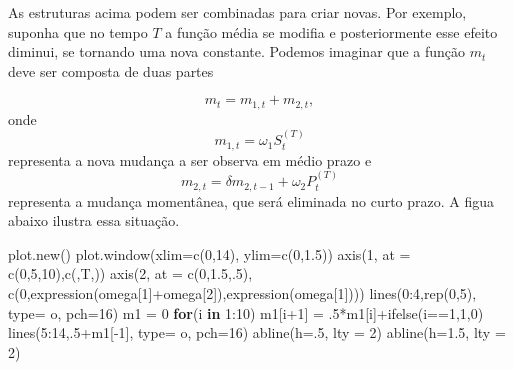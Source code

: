 \documentclass[
  letterpaper,
  DIV=11,
  numbers=noendperiod]{scrartcl}
\newenvironment{Shaded}{\begin{snugshade}}{\end{snugshade}}
\newcommand{\AttributeTok}[1]{\textcolor[rgb]{0.40,0.45,0.13}{#1}}
\newcommand{\ControlFlowTok}[1]{\textcolor[rgb]{0.00,0.23,0.31}{\textbf{#1}}}
\newcommand{\DecValTok}[1]{\textcolor[rgb]{0.68,0.00,0.00}{#1}}
\newcommand{\FloatTok}[1]{\textcolor[rgb]{0.68,0.00,0.00}{#1}}
\newcommand{\FunctionTok}[1]{\textcolor[rgb]{0.28,0.35,0.67}{#1}}
\newcommand{\NormalTok}[1]{\textcolor[rgb]{0.00,0.23,0.31}{#1}}
\newcommand{\OtherTok}[1]{\textcolor[rgb]{0.00,0.23,0.31}{#1}}
\newcommand{\SpecialCharTok}[1]{\textcolor[rgb]{0.37,0.37,0.37}{#1}}
\newcommand{\StringTok}[1]{\textcolor[rgb]{0.13,0.47,0.30}{#1}}
\theoremstyle{definition}
\theoremstyle{definition}
\theoremstyle{plain}
\theoremstyle{plain}
\theoremstyle{remark}
\begin{document}
As estruturas acima podem ser combinadas para criar novas. Por exemplo,
suponha que no tempo \(T\) a função média se modifia e posteriormente
esse efeito diminui, se tornando uma nova constante. Podemos imaginar
que a função \(m_t\) deve ser composta de duas partes

\[m_t = m_{1,t}+m_{2,t},\] onde \[m_{1,t}=\omega_1 S_{t}^{(T)}\]
representa a nova mudança a ser observa em médio prazo e
\[m_{2,t}=\delta m_{2,t-1}+\omega_2 P_{t}^{(T)}\] representa a mudança
momentânea, que será eliminada no curto prazo. A figua abaixo ilustra
essa situação.

\begin{Shaded}
\begin{Highlighting}[]
\FunctionTok{plot.new}\NormalTok{()}
\FunctionTok{plot.window}\NormalTok{(}\AttributeTok{xlim=}\FunctionTok{c}\NormalTok{(}\DecValTok{0}\NormalTok{,}\DecValTok{14}\NormalTok{), }\AttributeTok{ylim=}\FunctionTok{c}\NormalTok{(}\DecValTok{0}\NormalTok{,}\FloatTok{1.5}\NormalTok{))}
\FunctionTok{axis}\NormalTok{(}\DecValTok{1}\NormalTok{, }\AttributeTok{at =} \FunctionTok{c}\NormalTok{(}\DecValTok{0}\NormalTok{,}\DecValTok{5}\NormalTok{,}\DecValTok{10}\NormalTok{),}\FunctionTok{c}\NormalTok{(}\StringTok{\textquotesingle{}\textquotesingle{}}\NormalTok{,}\StringTok{\textquotesingle{}T\textquotesingle{}}\NormalTok{,}\StringTok{\textquotesingle{}\textquotesingle{}}\NormalTok{))}
\FunctionTok{axis}\NormalTok{(}\DecValTok{2}\NormalTok{, }\AttributeTok{at =} \FunctionTok{c}\NormalTok{(}\DecValTok{0}\NormalTok{,}\FloatTok{1.5}\NormalTok{,.}\DecValTok{5}\NormalTok{), }\FunctionTok{c}\NormalTok{(}\DecValTok{0}\NormalTok{,}\FunctionTok{expression}\NormalTok{(omega[}\DecValTok{1}\NormalTok{]}\SpecialCharTok{+}\NormalTok{omega[}\DecValTok{2}\NormalTok{]),}\FunctionTok{expression}\NormalTok{(omega[}\DecValTok{1}\NormalTok{])))}
\FunctionTok{lines}\NormalTok{(}\DecValTok{0}\SpecialCharTok{:}\DecValTok{4}\NormalTok{,}\FunctionTok{rep}\NormalTok{(}\DecValTok{0}\NormalTok{,}\DecValTok{5}\NormalTok{), }\AttributeTok{type=} \StringTok{\textquotesingle{}o\textquotesingle{}}\NormalTok{, }\AttributeTok{pch=}\DecValTok{16}\NormalTok{)}
\NormalTok{m1 }\OtherTok{=} \DecValTok{0}
\ControlFlowTok{for}\NormalTok{(i }\ControlFlowTok{in} \DecValTok{1}\SpecialCharTok{:}\DecValTok{10}\NormalTok{) m1[i}\SpecialCharTok{+}\DecValTok{1}\NormalTok{] }\OtherTok{=}\NormalTok{ .}\DecValTok{5}\SpecialCharTok{*}\NormalTok{m1[i]}\SpecialCharTok{+}\FunctionTok{ifelse}\NormalTok{(i}\SpecialCharTok{==}\DecValTok{1}\NormalTok{,}\DecValTok{1}\NormalTok{,}\DecValTok{0}\NormalTok{)}
\FunctionTok{lines}\NormalTok{(}\DecValTok{5}\SpecialCharTok{:}\DecValTok{14}\NormalTok{,.}\DecValTok{5}\SpecialCharTok{+}\NormalTok{m1[}\SpecialCharTok{{-}}\DecValTok{1}\NormalTok{], }\AttributeTok{type=} \StringTok{\textquotesingle{}o\textquotesingle{}}\NormalTok{, }\AttributeTok{pch=}\DecValTok{16}\NormalTok{)}
\FunctionTok{abline}\NormalTok{(}\AttributeTok{h=}\NormalTok{.}\DecValTok{5}\NormalTok{, }\AttributeTok{lty =} \DecValTok{2}\NormalTok{)}
\FunctionTok{abline}\NormalTok{(}\AttributeTok{h=}\FloatTok{1.5}\NormalTok{, }\AttributeTok{lty =} \DecValTok{2}\NormalTok{)}
\end{Highlighting}
\end{Shaded}
\end{document}
